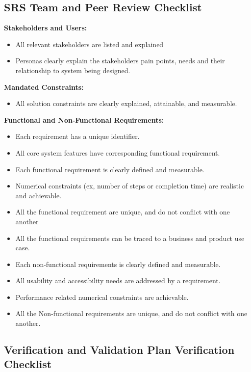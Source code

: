 \documentclass[12pt, titlepage]{article}
\begin{document}
\subsection{SRS Team and Peer Review Checklist}
\label{appendix:srs_checklist}
\textbf{Stakeholders and Users:}
\begin{itemize}
  \item All relevant stakeholders are listed and explained
  \item  Personas clearly explain the stakeholders pain points, needs
    and their relationship to system being designed.
\end{itemize}
\textbf{Mandated Constraints:}
\begin{itemize}
  \item All solution constraints are clearly explained, attainable, and
    measurable.
\end{itemize}
\textbf{Functional and Non-Functional Requirements:}
\begin{itemize}
  \item Each requirement has a unique identifier.
  \item All core system features have corresponding functional requirement.
  \item Each functional requirement is clearly defined and measurable.
  \item Numerical constraints (ex, number of steps or completion time)
    are realistic and achievable.
  \item All the functional requirement are unique, and do not conflict
    with one another
  \item All the functional requirements can be traced to a business and
    product use case.
  \item Each non-functional requirements is clearly defined and measurable.
  \item All usability and accessibility needs are addressed by a requirement.
  \item Performance related numerical constraints are achievable.
  \item All the Non-functional requirements are unique, and do not
    conflict with one another.
\end{itemize}

\subsection{Verification and Validation Plan Verification Checklist}
\label{appendix:v_v_checklist}
\end{document}
